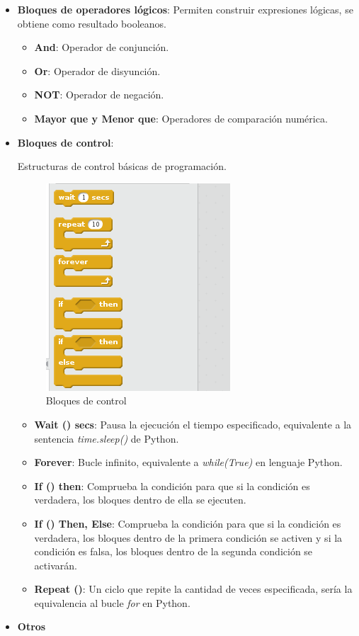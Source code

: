 \begin{itemize}
\item \textbf{Bloques de operadores lógicos}:
Permiten construir expresiones lógicas, se obtiene como resultado booleanos.
\begin{itemize}

 \item \textbf{And}: Operador de conjunción.
 \item \textbf{Or}: Operador de disyunción.
 \item \textbf{NOT}: Operador de negación.
 \item \textbf{Mayor que y Menor que}: Operadores de comparación numérica.
\end{itemize}

\item \textbf{Bloques de control}:

Estructuras de control básicas de programación.

\begin{figure}[H]
    	\centering
    	\includegraphics[scale=0.60]{img/bloques-control.png}
     	\caption{Bloques de control}
  	\label{fig:control}
\end{figure}
\begin{itemize}
\item \textbf{Wait () secs}: Pausa la ejecución el tiempo especificado, equivalente a la sentencia \textit{time.sleep()} de Python.
\item \textbf{Forever}: Bucle infinito, equivalente a \textit{while(True)} en lenguaje Python.
\item \textbf{If () then}: Comprueba la condición para que si la condición es verdadera, los bloques dentro de ella se ejecuten.
\item \textbf{If () Then, Else}: Comprueba la condición para que si la condición es verdadera, los bloques dentro de la primera condición se activen y si la condición es falsa, los bloques dentro de la segunda condición se activarán.
\item \textbf{Repeat ()}: Un ciclo que repite la cantidad de veces especificada, sería la equivalencia al bucle \textit{for} en Python.
\end{itemize}
\item \textbf{Otros}
\begin{itemize}


\end{itemize}
\end{itemize}
